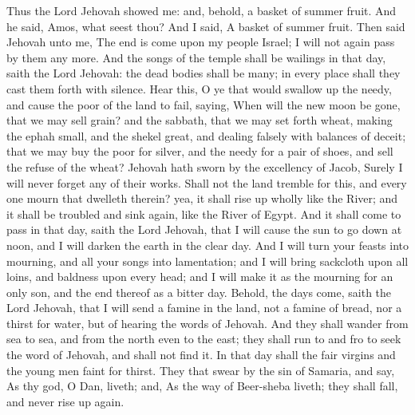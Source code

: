 Thus the Lord Jehovah showed me: and, behold, a basket of summer fruit. And he said, Amos, what seest thou? And I said, A basket of summer fruit. Then said Jehovah unto me, The end is come upon my people Israel; I will not again pass by them any more. And the songs of the temple shall be wailings in that day, saith the Lord Jehovah: the dead bodies shall be many; in every place shall they cast them forth with silence.  Hear this, O ye that would swallow up the needy, and cause the poor of the land to fail, saying, When will the new moon be gone, that we may sell grain? and the sabbath, that we may set forth wheat, making the ephah small, and the shekel great, and dealing falsely with balances of deceit; that we may buy the poor for silver, and the needy for a pair of shoes, and sell the refuse of the wheat? Jehovah hath sworn by the excellency of Jacob, Surely I will never forget any of their works. Shall not the land tremble for this, and every one mourn that dwelleth therein? yea, it shall rise up wholly like the River; and it shall be troubled and sink again, like the River of Egypt. And it shall come to pass in that day, saith the Lord Jehovah, that I will cause the sun to go down at noon, and I will darken the earth in the clear day. And I will turn your feasts into mourning, and all your songs into lamentation; and I will bring sackcloth upon all loins, and baldness upon every head; and I will make it as the mourning for an only son, and the end thereof as a bitter day.  Behold, the days come, saith the Lord Jehovah, that I will send a famine in the land, not a famine of bread, nor a thirst for water, but of hearing the words of Jehovah. And they shall wander from sea to sea, and from the north even to the east; they shall run to and fro to seek the word of Jehovah, and shall not find it. In that day shall the fair virgins and the young men faint for thirst. They that swear by the sin of Samaria, and say, As thy god, O Dan, liveth; and, As the way of Beer-sheba liveth; they shall fall, and never rise up again. 

